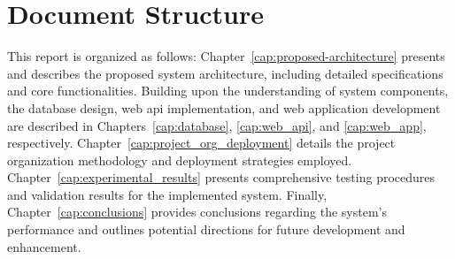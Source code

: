 %
%
\section{Document Structure}\label{sec:document_structure}
This report is organized as follows: Chapter~\ref{cap:proposed-architecture} presents and describes the proposed system architecture, including detailed specifications and core functionalities. Building upon the understanding of system components, the database design, web \acs{api} implementation, and web application development are described in Chapters~\ref{cap:database}, \ref{cap:web_api}, and \ref{cap:web_app}, respectively. Chapter~\ref{cap:project_org_deployment} details the project organization methodology and deployment strategies employed. Chapter~\ref{cap:experimental_results} presents comprehensive testing procedures and validation results for the implemented system. Finally, Chapter~\ref{cap:conclusions} provides conclusions regarding the system's performance and outlines potential directions for future development and enhancement. 